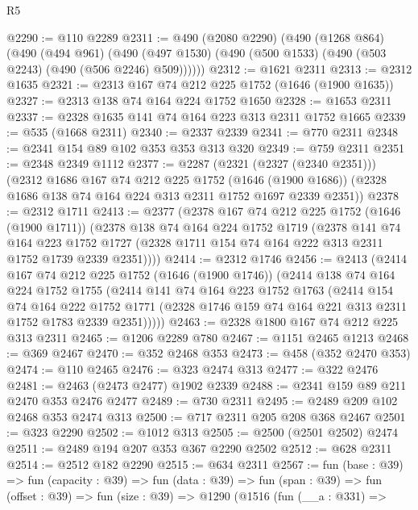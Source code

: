 \begin{lexlean}{R5}
\begin{coremodule}
@2290 := @110 @2289
@2311 := @490
    (@2080 @2290)
    (@490
      (@1268 @864)
      (@490
        (@494 @961)
        (@490 (@497 @1530) (@490 (@500 @1533) (@490 (@503 @2243) (@490 (@506 @2246) @509))))))
@2312 := @1621 @2311
@2313 := @2312 @1635
@2321 := @2313 @167 @74 @212 @225 @1752 (@1646 (@1900 @1635))
@2327 := @2313 @138 @74 @164 @224 @1752 @1650
@2328 := @1653 @2311
@2337 := @2328 @1635 @141 @74 @164 @223 @313 @2311 @1752 @1665
@2339 := @535 (@1668 @2311)
@2340 := @2337 @2339
@2341 := @770 @2311
@2348 := @2341 @154 @89 @102 @353 @353 @313 @320
@2349 := @759 @2311
@2351 := @2348 @2349 @1112
@2377 := @2287
    (@2321 (@2327 (@2340 @2351)))
    (@2312
      @1686
      @167
      @74
      @212
      @225
      @1752
      (@1646 (@1900 @1686))
      (@2328 @1686 @138 @74 @164 @224 @313 @2311 @1752 @1697 @2339 @2351))
@2378 := @2312 @1711
@2413 := @2377
    (@2378
      @167
      @74
      @212
      @225
      @1752
      (@1646 (@1900 @1711))
      (@2378
        @138
        @74
        @164
        @224
        @1752
        @1719
        (@2378
          @141
          @74
          @164
          @223
          @1752
          @1727
          (@2328 @1711 @154 @74 @164 @222 @313 @2311 @1752 @1739 @2339 @2351))))
@2414 := @2312 @1746
@2456 := @2413
    (@2414
      @167
      @74
      @212
      @225
      @1752
      (@1646 (@1900 @1746))
      (@2414
        @138
        @74
        @164
        @224
        @1752
        @1755
        (@2414
          @141
          @74
          @164
          @223
          @1752
          @1763
          (@2414
            @154
            @74
            @164
            @222
            @1752
            @1771
            (@2328 @1746 @159 @74 @164 @221 @313 @2311 @1752 @1783 @2339 @2351)))))
@2463 := @2328 @1800 @167 @74 @212 @225 @313 @2311
@2465 := @1206 @2289 @780
@2467 := @1151 @2465 @1213
@2468 := @369 @2467
@2470 := @352 @2468 @353
@2473 := @458 (@352 @2470 @353)
@2474 := @110 @2465
@2476 := @323 @2474 @313
@2477 := @322 @2476
@2481 := @2463 (@2473 @2477) @1902 @2339
@2488 := @2341 @159 @89 @211 @2470 @353 @2476 @2477
@2489 := @730 @2311
@2495 := @2489 @209 @102 @2468 @353 @2474 @313
@2500 := @717 @2311 @205 @208 @368 @2467
@2501 := @323 @2290
@2502 := @1012 @313
@2505 := @2500 (@2501 @2502) @2474
@2511 := @2489 @194 @207 @353 @367 @2290 @2502
@2512 := @628 @2311
@2514 := @2512 @182 @2290
@2515 := @634 @2311
@2567 := fun (base : @39) =>
  fun (capacity : @39) =>
  fun (data : @39) =>
  fun (span : @39) =>
  fun (offset : @39) =>
  fun (size : @39) =>
  @1290
    (@1516
      (fun (__a : @331) =>

\end{coremodule}
\end{lexlean}
